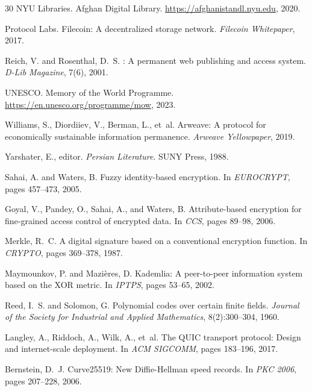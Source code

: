 \documentclass[11pt,a4paper]{article}
\begin{document}
\begin{thebibliography}{30}
NYU Libraries.
\newblock Afghan Digital Library.
\newblock \url{https://afghanistandl.nyu.edu}, 2020.

Protocol Labs.
\newblock Filecoin: A decentralized storage network.
\newblock \emph{Filecoin Whitepaper}, 2017.

Reich, V. and Rosenthal, D.~S.
: A permanent web publishing and access system.
\newblock \emph{D-Lib Magazine}, 7(6), 2001.

UNESCO.
\newblock Memory of the World Programme.
\newblock \url{https://en.unesco.org/programme/mow}, 2023.

Williams, S., Diordiiev, V., Berman, L., et~al.
\newblock Arweave: A protocol for economically sustainable information permanence.
\newblock \emph{Arweave Yellowpaper}, 2019.

Yarshater, E., editor.
\newblock \emph{Persian Literature}.
\newblock SUNY Press, 1988.

Sahai, A. and Waters, B.
\newblock Fuzzy identity-based encryption.
\newblock In \emph{EUROCRYPT}, pages 457--473, 2005.

Goyal, V., Pandey, O., Sahai, A., and Waters, B.
\newblock Attribute-based encryption for fine-grained access control of encrypted data.
\newblock In \emph{CCS}, pages 89--98, 2006.

Merkle, R.~C.
\newblock A digital signature based on a conventional encryption function.
\newblock In \emph{CRYPTO}, pages 369--378, 1987.

Maymounkov, P. and Mazi\`{e}res, D.
\newblock Kademlia: A peer-to-peer information system based on the {XOR} metric.
\newblock In \emph{IPTPS}, pages 53--65, 2002.

Reed, I.~S. and Solomon, G.
\newblock Polynomial codes over certain finite fields.
\newblock \emph{Journal of the Society for Industrial and Applied Mathematics}, 8(2):300--304, 1960.

Langley, A., Riddoch, A., Wilk, A., et~al.
\newblock The {QUIC} transport protocol: Design and internet-scale deployment.
\newblock In \emph{ACM SIGCOMM}, pages 183--196, 2017.

Bernstein, D.~J.
\newblock Curve25519: New {Diffie-Hellman} speed records.
\newblock In \emph{PKC 2006}, pages 207--228, 2006.

\end{thebibliography}
\end{document}
